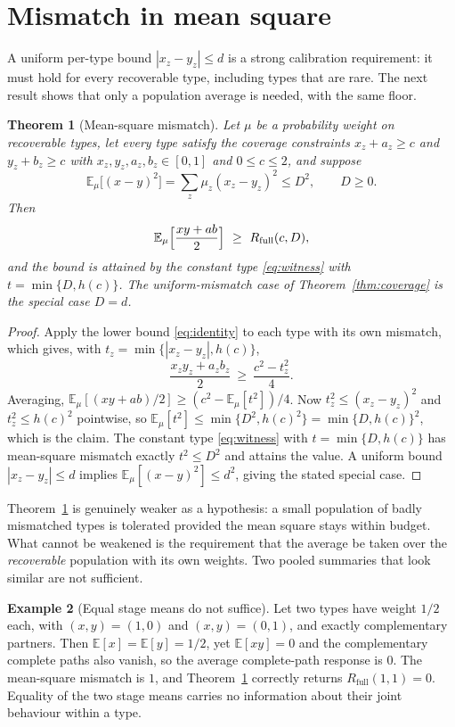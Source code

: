 \documentclass[11pt]{article}
\newtheorem{theorem}{Theorem}[section]
\theoremstyle{definition}
\newtheorem{example}[theorem]{Example}
\theoremstyle{remark}
\newcommand{\E}{\mathbb{E}}
\newcommand{\Rfull}{R_{\mathrm{full}}}
\newcommand{\hc}{h(c)}
\begin{document}
\section{Mismatch in mean square}\label{sec:moment}

A uniform per-type bound $|x_z-y_z|\le d$ is a strong calibration requirement:
it must hold for every recoverable type, including types that are rare. The next
result shows that only a population average is needed, with the same floor.

\begin{theorem}[Mean-square mismatch]\label{thm:moment}
Let $\mu$ be a probability weight on recoverable types, let every type satisfy
the coverage constraints $x_z+a_z\ge c$ and $y_z+b_z\ge c$ with
$x_z,y_z,a_z,b_z\in[0,1]$ and $0\le c\le2$, and suppose
\[
\E_\mu\bigl[(x-y)^2\bigr]=\sum_z\mu_z(x_z-y_z)^2\le D^2,\qquad D\ge0 .
\]
Then
\[
\E_\mu\Bigl[\frac{xy+ab}{2}\Bigr]\ \ge\ \Rfull(c,D),
\]
and the bound is attained by the constant type \eqref{eq:witness} with
$t=\min\{D,\hc\}$. The uniform-mismatch case of Theorem~\ref{thm:coverage} is
the special case $D=d$.
\end{theorem}

\begin{proof}
Apply the lower bound \eqref{eq:identity} to each type with its own mismatch,
which gives, with $t_z=\min\{|x_z-y_z|,\hc\}$,
\[
\frac{x_zy_z+a_zb_z}{2}\ \ge\ \frac{c^2-t_z^2}{4}.
\]
Averaging, $\E_\mu[(xy+ab)/2]\ge(c^2-\E_\mu[t^2])/4$. Now
$t_z^2\le(x_z-y_z)^2$ and $t_z^2\le \hc^2$ pointwise, so
$\E_\mu[t^2]\le\min\{D^2,\hc^2\}=\min\{D,\hc\}^2$, which is the claim. The
constant type \eqref{eq:witness} with $t=\min\{D,\hc\}$ has mean-square mismatch
exactly $t^2\le D^2$ and attains the value. A uniform bound $|x_z-y_z|\le d$
implies $\E_\mu[(x-y)^2]\le d^2$, giving the stated special case.
\end{proof}

Theorem~\ref{thm:moment} is genuinely weaker as a hypothesis: a small population
of badly mismatched types is tolerated provided the mean square stays within
budget. What cannot be weakened is the requirement that the average be taken
over the \emph{recoverable} population with its own weights. Two pooled
summaries that look similar are not sufficient.

\begin{example}[Equal stage means do not suffice]\label{ex:means}
Let two types have weight $1/2$ each, with $(x,y)=(1,0)$ and $(x,y)=(0,1)$, and
exactly complementary partners. Then $\E[x]=\E[y]=1/2$, yet $\E[xy]=0$ and the
complementary complete paths also vanish, so the average complete-path response
is $0$. The mean-square mismatch is $1$, and Theorem~\ref{thm:moment} correctly
returns $\Rfull(1,1)=0$. Equality of the two stage means carries no information
about their joint behaviour within a type.
\end{example}
\end{document}
